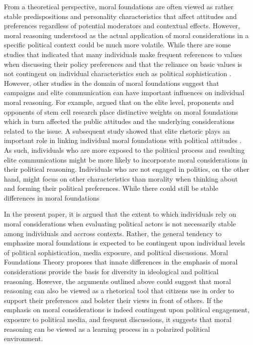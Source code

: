 \documentclass[12pt]{paper}
\begin{document}
From a theoretical perspective, moral foundations are often viewed as rather stable predispositions and personality characteristics that affect attitudes and preferences regardless of potential moderators and contextual effects. However, moral reasoning understood as the actual application of moral considerations in a specific political context could be much more volatile. While there are some studies that indicated that many individuals make frequent references to values when discussing their policy preferences \citet{feldman1992political} and that the reliance on basic values is not contingent on individual characteristics such as political sophistication \citep[e.g.][]{goren2001core,goren2004political,marietta2007values}. However, other studies in the domain of moral foundations suggest that campaigns and elite communication can have important influences on individual moral reasoning. For example, \citet{clifford2013words} argued that on the elite level, proponents and opponents of stem cell research place distinctive weights on moral foundations which in turn affected the public attitudes and the underlying considerations related to the issue. A subsequent study showed that elite rhetoric plays an important role in linking individual moral foundations with political attitudes \citep{clifford2015concerns}. As such, individuals who are more exposed to the political process and resulting elite communications might be more likely to incorporate moral considerations in their political reasoning. Individuals who are not engaged in politics, on the other hand, might focus on other characteristics than morality when thinking about and forming their political preferences. While there could still be stable differences in moral foundations 

In the present paper, it is argued that the extent to which individuals rely on moral considerations when evaluating political actors is not necessarily stable among individuals and accross contexts. Rather, the general tendency to emphasize moral foundations is expected to be contingent upon individual levels of political sophistication, media exposure, and political discussions. Moral Foundations Theory proposes that innate differences in the emphasis of moral considerations provide the basis for diversity in ideological and political reasoning. However, the arguments outlined above could suggest that moral reasoning can also be viewed as a rhetorical tool that citizens use in order to support their preferences and bolster their views in front of others. If the emphasis on moral considerations is indeed contingent upon political engagement, exposure to political media, and frequent discussions, it suggests that moral reasoning can be viewed as a learning process in a polarized political environment.
\end{document}
